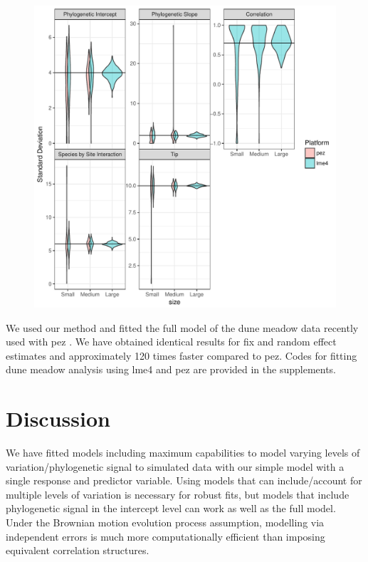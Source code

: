 \begin{center}
\begin{figure}[h]
\includegraphics[scale=0.8,page=2]{./csplot.pdf}
\end{figure}
\end{center}


We used our method and fitted the full model of the dune meadow data recently used with pez \cite{li2017canfun}. 
We have obtained identical results for fix and random effect estimates and approximately 120 times faster compared to pez. 
Codes for fitting dune meadow analysis using lme4 and pez are provided in the supplements. 

\newpage

\section{Discussion}

We have fitted models including maximum capabilities to model varying levels of variation/phylogenetic signal to simulated data with our simple model with a single response and predictor variable.
Using models that can include/account for multiple levels of variation is necessary for robust fits, but models that include phylogenetic signal in the intercept level can work as well as the full model.
Under the Brownian motion evolution process assumption, modelling via independent errors is much more computationally efficient than imposing equivalent correlation structures.

